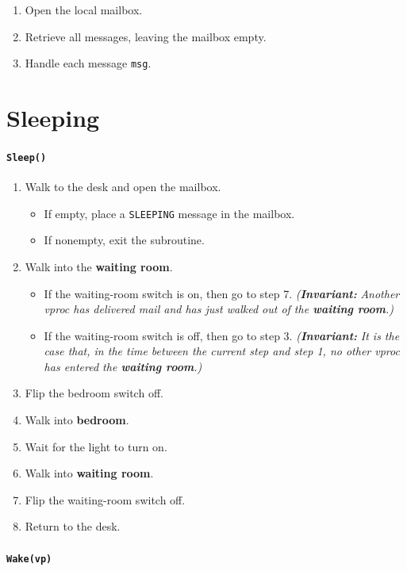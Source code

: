\documentclass[11pt]{article}
\begin{document}
{\begin{enumerate}
  \item Open the local mailbox.
  \item Retrieve all messages, leaving the mailbox empty.
  \item Handle each message \texttt{msg}.
\end{enumerate}

\section{Sleeping}

\paragraph{\texttt{Sleep()}}

\begin{enumerate}
  \item Walk to the desk and open the mailbox.
    \begin{itemize}
      \item If empty, place a \texttt{SLEEPING} message in the mailbox.
      \item If nonempty, exit the subroutine.
    \end{itemize}
  \item Walk into the \textbf{waiting room}.
    \begin{itemize}
      \item If the waiting-room switch is on, then go to step 7. \textit{(\textbf{Invariant:}} \textit{Another vproc has delivered mail and has just walked out of the \textbf{waiting room}.)}
      \item If the waiting-room switch is off, then go to step 3. \textit{(\textbf{Invariant:}} \textit{It is the case that, in the time between the current step and step 1, no other vproc has entered the \textbf{waiting room}.)}
    \end{itemize}
  \item Flip the bedroom switch off.
  \item Walk into \textbf{bedroom}.
  \item Wait for the light to turn on.
  \item Walk into \textbf{waiting room}.
  \item Flip the waiting-room switch off.
  \item Return to the desk.
\end{enumerate}

\paragraph{\texttt{Wake(vp)}}

}
\end{document}
